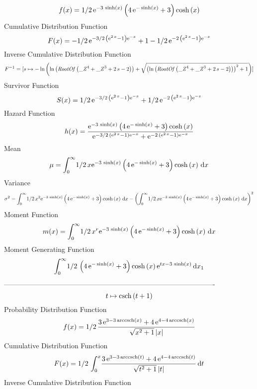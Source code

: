 \documentclass[12pt]{article}
\begin{document}
$$  f(x)=1/2\,{{\rm e}^{-3\,\sinh \left( x \right) }} \left( 4\,{{\rm e}^{-
\sinh \left( x \right) }}+3 \right) \cosh \left( x \right) 
$$Cumulative Distribution Function  
 $$F(x)=-1/2\,{{\rm e}^{-3/2\, \left( {{\rm e}^{2\,x}}-1 \right) {{\rm e}^{-x}
}}}+1-1/2\,{{\rm e}^{-2\, \left( {{\rm e}^{2\,x}}-1 \right) {{\rm e}^{
-x}}}}
$$ Inverse Cumulative Distribution Function 
  $$F^{-1} = [s\mapsto -\ln  \left( \ln  \left( {\it RootOf} \left( {{\it \_Z}}^{4}
+{{\it \_Z}}^{3}+2\,s-2 \right)  \right) +\sqrt { \left( \ln  \left( {
\it RootOf} \left( {{\it \_Z}}^{4}+{{\it \_Z}}^{3}+2\,s-2 \right) 
 \right)  \right) ^{2}+1} \right) ]
$$Survivor Function 
 $$ S(x)=1/2\,{{\rm e}^{-3/2\, \left( {{\rm e}^{2\,x}}-1 \right) {{\rm e}^{-x}}
}}+1/2\,{{\rm e}^{-2\, \left( {{\rm e}^{2\,x}}-1 \right) {{\rm e}^{-x}
}}}
$$ Hazard Function 
 $$ h(x)={\frac {{{\rm e}^{-3\,\sinh \left( x \right) }} \left( 4\,{{\rm e}^{-
\sinh \left( x \right) }}+3 \right) \cosh \left( x \right) }{{{\rm e}^
{-3/2\, \left( {{\rm e}^{2\,x}}-1 \right) {{\rm e}^{-x}}}}+{{\rm e}^{-
2\, \left( {{\rm e}^{2\,x}}-1 \right) {{\rm e}^{-x}}}}}}
$$Mean 
 $$ \mu=\int_{0}^{\infty }\!1/2\,x{{\rm e}^{-3\,\sinh \left( x \right) }}
 \left( 4\,{{\rm e}^{-\sinh \left( x \right) }}+3 \right) \cosh
 \left( x \right) \,{\rm d}x
$$ Variance 
 $$ \sigma^2 = \int_{0}^{\infty }\!1/2\,{x}^{2}{{\rm e}^{-3\,\sinh \left( x \right) }
} \left( 4\,{{\rm e}^{-\sinh \left( x \right) }}+3 \right) \cosh
 \left( x \right) \,{\rm d}x- \left( \int_{0}^{\infty }\!1/2\,x{
{\rm e}^{-3\,\sinh \left( x \right) }} \left( 4\,{{\rm e}^{-\sinh
 \left( x \right) }}+3 \right) \cosh \left( x \right) \,{\rm d}x
 \right) ^{2}
$$Moment Function 
 $$ m(x) = \int_{0}^{\infty }\!1/2\,{x}^{r}{{\rm e}^{-3\,\sinh \left( x \right) }
} \left( 4\,{{\rm e}^{-\sinh \left( x \right) }}+3 \right) \cosh
 \left( x \right) \,{\rm d}x
$$ Moment Generating Function 
 $$\int_{0}^{\infty }\!1/2\, \left( 4\,{{\rm e}^{-\sinh \left( x \right) 
}}+3 \right) \cosh \left( x \right) {{\rm e}^{tx-3\,\sinh \left( x
 \right) }}\,{\rm d}x_{{1}}
$$-------------------------------------------------------------------------------------------  \\$$t\mapsto {\rm csch} \left(t+1\right)
$$Probability Distribution Function 
$$  f(x)=1/2\,{\frac {3\,{{\rm e}^{3-3\,{\rm arccsch} \left(x\right)}}+4\,{
{\rm e}^{4-4\,{\rm arccsch} \left(x\right)}}}{\sqrt {{x}^{2}+1}
 \left| x \right| }}
$$Cumulative Distribution Function  
 $$F(x)=1/2\,\int_{0}^{x}\!{\frac {3\,{{\rm e}^{3-3\,{\rm arccsch} \left(t
\right)}}+4\,{{\rm e}^{4-4\,{\rm arccsch} \left(t\right)}}}{\sqrt {{t}
^{2}+1} \left| t \right| }}\,{\rm d}t
$$ Inverse Cumulative Distribution Function 
\end{document}
